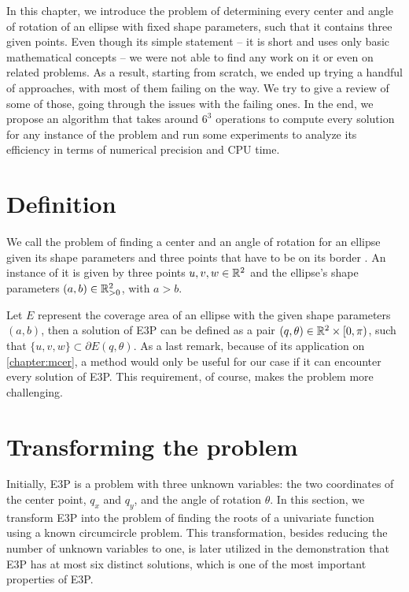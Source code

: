 In this chapter, we introduce the problem of determining every center and angle of rotation of an ellipse with fixed shape parameters, such that it contains three given points.
Even though its simple statement -- it is short and uses only basic mathematical concepts -- we were not able to find any work on it or even on related problems.
As a result, starting from scratch, we ended up trying a handful of approaches, with most of them failing on the way. We try to give a review of some of those, going through the issues with the failing ones. In the end, we propose an algorithm that takes around $6^3$ operations to compute every solution for any instance of the problem and run some experiments to analyze its efficiency in terms of numerical precision and CPU time.

\section{Definition}

We call the problem of finding a center and an angle of rotation for an ellipse given its shape parameters and three points that have to be on its border . An instance of it is given by three points $u, v, w \in \mathbb{R}^2$ and the ellipse's shape parameters $(a, b) \in \mathbb{R}^2_{>0}$, with $a > b$.

Let $E$ represent the coverage area of an ellipse with the given shape parameters $(a, b)$, then a solution of E3P can be defined as a pair $(q, \theta) \in \mathbb{R}^2\times[0, \pi)$, such that $\{u, v, w\} \subset \partial E(q, \theta)$. As a last remark, because of its application on \autoref{chapter:mcer}, a method would only be useful for our case if it can encounter every solution of E3P. This requirement, of course, makes the problem more challenging.

\section{Transforming the problem}

Initially, E3P is a problem with three unknown variables: the two coordinates of the center point, $q_x$ and $q_y$, and the angle of rotation $\theta$. In this section, we transform E3P into the problem of finding the roots of a univariate function using a known circumcircle problem. 
This transformation, besides reducing the number of unknown variables to one, is later utilized in the demonstration that E3P has at most six distinct solutions, which is one of the most important properties of E3P.

